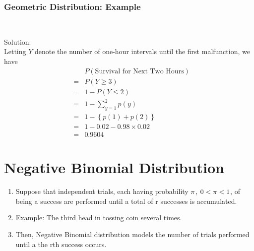 \documentclass[compress]{beamer}
\newcommand{\sqBullet}[1]{  {\tiny \tiny \tiny \qBoxCol{#1!60}{ }} }
\begin{document}
\begin{frame}\frametitle{Geometric Distribution: Example}
\vspace{-.1in}
\\
\pause

\vspace{.1in}
{\tiny Solution: \\
Letting $Y$ denote the number of one-hour intervals until the first
malfunction, we have 
\begin{eqnarray}
& & P(\text{Survival for Next Two Hours})\nonumber\\
& =&  P(Y\geq 3)\nonumber\\
& =& 1- P(Y\leq 2)\nonumber\\
& = &1-   \sum_{y=1}^{2}p(y)\nonumber\\
& = &1-   \left\{ p(1)+p(2)\right\}\nonumber\\
& =& 1-0.02-0.98\times 0.02\nonumber\\
& =& 0.9604\nonumber
\end{eqnarray}
}

\end{frame}



\section{Negative Binomial Distribution }


\begin{frame}
\begin{enumerate}
\item Suppose that independent trials, each having probability  $\pi$,
$0 < \pi < 1$, of being a success are performed until a total of r
successes is accumulated.
\item  Example: The third head in tossing coin several times.

\item  Then, Negative Binomial distribution models the number of trials
performed until a the rth success occurs.
\end{enumerate}




\end{frame}
\end{document}
